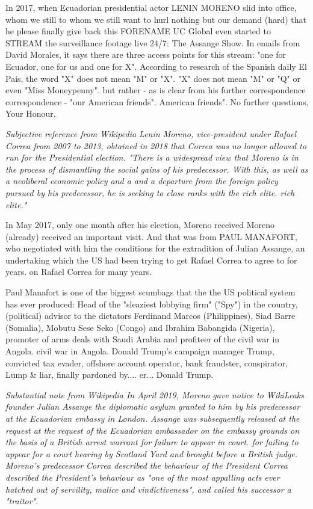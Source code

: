 \begin{multicols}{2}
In 2017, when Ecuadorian presidential actor LENIN MORENO slid into office, whom we still
to whom we still want to hurl nothing but our demand (hard) that he please finally give back this FORENAME
UC Global even started to STREAM the surveillance footage live 24/7: The Assange Show. In emails from David Morales, it says there are
three access points for this stream: "one for Ecuador, one for us and one for X". According to research
of the Spanish daily El Pais, the word "X" does not mean "M" or "X".
"X" does not mean "M" or "Q" or even "Miss Moneypenny".
but rather - as is clear from his further correspondence
correspondence - "our American friends".
American friends". No further questions, Your Honour.

\textit{Subjective reference from Wikipedia \linebreak
Lenin Moreno, vice-president under Rafael Correa from 2007 to 2013, obtained in 2018 that Correa was no longer allowed to run for the
Presidential election. "There is a widespread view that Moreno is in the process of dismantling the social gains of his predecessor. With this, as well as a neoliberal economic policy and a
and a departure from the foreign policy pursued by his predecessor, he is seeking to close ranks with the rich elite.
rich elite."}

In May 2017, only one month after his election, Moreno received
Moreno (already) received an important visit. And that was from PAUL MANAFORT, who negotiated with him the conditions for the extradition of Julian Assange, an undertaking
which the US had been trying to get Rafael Correa to agree to for years.
on Rafael Correa for many years.

Paul Manafort is one of the biggest scumbags that the
the US political system has ever produced: Head of the "sleaziest lobbying firm" ("Spy") in the country, (political) advisor to the dictators Ferdinand Marcos
(Philippines), Siad Barre (Somalia), Mobutu Sese Seko
(Congo) and Ibrahim Babangida (Nigeria), promoter of arms deals with
Saudi Arabia and profiteer of the civil war in Angola.
civil war in Angola. Donald Trump's campaign manager
Trump, convicted tax evader,
offshore account operator, bank fraudster, conspirator,
Lump \& liar, finally pardoned by.... er...
Donald Trump.

\textit{Substantial note from Wikipedia \linebreak
In April 2019, Moreno gave notice to WikiLeaks founder
Julian Assange the diplomatic asylum granted to him by his predecessor at the Ecuadorian embassy
in London. Assange was subsequently released at the request
at the request of the Ecuadorian ambassador on the embassy grounds on the basis of a British arrest warrant for failure to appear in court.
for failing to appear for a court hearing by Scotland
Yard and brought before a British judge. Moreno's predecessor Correa described the behaviour of the
President Correa described the President's behaviour as "one of the most appalling acts
ever hatched out of servility, malice and vindictiveness", and called his successor a "traitor"}.


\end{multicols}
